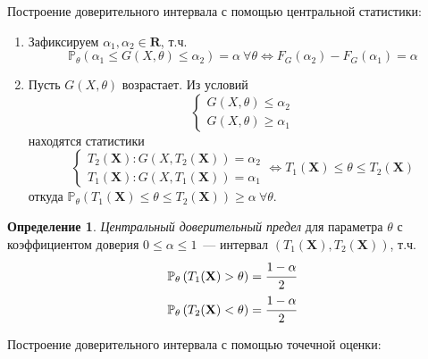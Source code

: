 \documentclass[oneside,final,14pt]{extreport}
\theoremstyle{definition}
\newtheorem{defn}{Определение}[section]
\begin{document}
Построение доверительного интервала с помощью центральной статистики:
\begin{enumerate}
    \item Зафиксируем $\alpha_{1}, \alpha_{2} \in \mathbf{R}$, т.ч.
    \begin{equation*}
        \mathbb{P}_{\theta}(\alpha_{1} \leq G(X, \theta) \leq \alpha_{2})=\alpha~\forall \theta \Leftrightarrow F_{G}(\alpha_{2})-F_{G}(\alpha_{1})=\alpha
    \end{equation*}
    \item Пусть $G(X,\theta)$ возрастает. Из условий
    \begin{equation*}
        \left\{\begin{array}{l}
        G(X, \theta) \leq \alpha_{2} \\
        G(X, \theta) \geq \alpha_{1}
        \end{array}\right.
    \end{equation*}
    находятся статистики
    \begin{equation*}
        \left\{\begin{array}{l}
            T_{2}(\mathbf{X}): G(X, T_{2}(\mathbf{X}))=\alpha_{2} \\ 
            T_{1}(\mathbf{X}): G(X, T_{1}(\mathbf{X}))=\alpha_{1}
        \end{array} 
        \Leftrightarrow T_{1}(\mathbf{X}) \leq \theta \leq T_{2}(\mathbf{X})\right.
    \end{equation*}
    откуда $\mathbb{P}_{\theta}\left(T_{1}(\mathbf{X}) \leq \theta \leq T_{2}(\mathbf{X})\right) \geq \alpha~ \forall \theta$.
\end{enumerate}

\begin{defn}
{\it Центральный доверительный предел} для параметра $\theta$ с коэффициентом доверия $0 \leq \alpha \leq 1$~--- интервал $(T_1(\mathbf{X}), T_2(\mathbf{X}))$, т.ч. 
\begin{gather*}
    \mathbb{P}_{\theta}\left(T_{1}(\mathbf{X})>\theta\right)=\cfrac{1-\alpha}{2} \\
    \mathbb{P}_{\theta}\left(T_{2}(\mathbf{X})<\theta\right)=\cfrac{1-\alpha}{2}
\end{gather*}
\end{defn}

Построение доверительного интервала с помощью точечной оценки:
\end{document}

